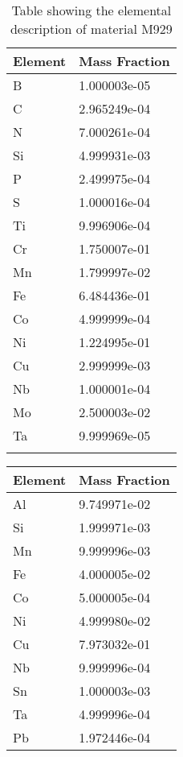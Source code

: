 \begin{centering}
\begin{longtable}[ht!]
\caption{Table showing the elemental description of material M933}
\label{table:material_EPTRAP}
\end{longtable}
\clearpage
\begin{longtable}[ht!]
{ p{} | p{} }
\hline
Element & Mass Fraction\\
\hline
B &  1.000003e-05\\
C &  2.965249e-04\\
N &  7.000261e-04\\
Si &  4.999931e-03\\
P &  2.499975e-04\\
S &  1.000016e-04\\
Ti &  9.996906e-04\\
Cr &  1.750007e-01\\
Mn &  1.799997e-02\\
Fe &  6.484436e-01\\
Co &  4.999999e-04\\
Ni &  1.224995e-01\\
Cu &  2.999999e-03\\
Nb &  1.000001e-04\\
Mo &  2.500003e-02\\
Ta &  9.999969e-05\\
\caption{Table showing the elemental description of material M929}
\label{table:material_PPWater}
\end{longtable}
\clearpage
\begin{longtable}[ht!]
  { p{} | p{} }
\hline
Element & Mass Fraction\\
\hline
Al &  9.749971e-02\\
Si &  1.999971e-03\\
Mn &  9.999996e-03\\
Fe &  4.000005e-02\\
Co &  5.000005e-04\\
Ni &  4.999980e-02\\
Cu &  7.973032e-01\\
Nb &  9.999996e-04\\
Sn &  1.000003e-03\\
Ta &  4.999996e-04\\
Pb &  1.972446e-04\\


\end{longtable}
\end{centering}
